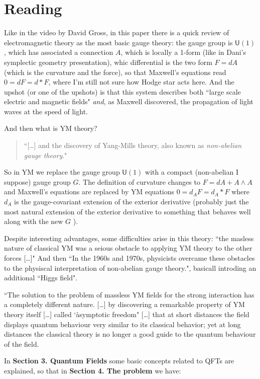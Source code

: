 \section{Reading \cite{yangmills}}

Like in the video by David Gross, in this paper there is a quick review of
electromagnetic theory as the most basic gauge theory: the gauge group is
\(\mathsf{U}(1)\), which has associated a connection $A$, which is locally a
1-form ({\color{6}like in Dani's symplectic geometry presentation}), whic
differential is the two form \(F=dA\) ({\color{6}which is the curvature and the
force}), so that Maxwell's equations read \(0=dF=d * F\), {\color{6}where I'm
still not sure how Hodge star acts here}. And the upshot (or one of the upshots)
is that this system describes both ``large scale electric and magnetic fields"
\textit{and}, as Maxwell discovered, the propagation of light waves at the speed
of light.

And then what is YM theory?
\begin{quotation}
 ``[…] and the discovery of Yang-Mills theory, also known as \textit{non-abelian
 gauge theory}."
\end{quotation}
So in YM we replace the gauge group \(\mathsf{U}(1)\) with a compact
({\color{6}non-abelian I suppose}) gauge group \(G\). The definition of
curvature changes to \(F=dA+A \wedge A\) and Maxwell's equations are replaced by
YM equations \(0=d_AF=d_A * F\) where \(d_A\) is the gauge-covariant extension
of the exterior derivative ({\color{6}probably just the most natural extension
of the exterior derivative to something that behaves well along with the new
\(G\) }).

Despite interesting advantages, some difficulties arise in this theory: ``the
masless nature of classical YM was a seious obstacle to applying YM theory to
the other forces […]" And then ``In the 1960s and 1970s, physicists overcame
these obstacles to the physiscal interpretation of non-abelian gauge theory.",
basicall introding an additional ``Higgs field".

``The solution to the problem of massless YM fields for the strong interaction
has a completely different nature. […] by discovering a remarkable property of
YM theory itself […] called `àsymptotic freedom" […] that at short distances the
field displays quantum behaviour very similar to its classical behavior; yet at
long distances the classical theory is no longer a good guide to the quantum
behaviour of the field.

In \textbf{Section 3. Quantum Fields} some basic concepts related to QFTs are
explained, so that in \textbf{Section 4. The problem} we have:

